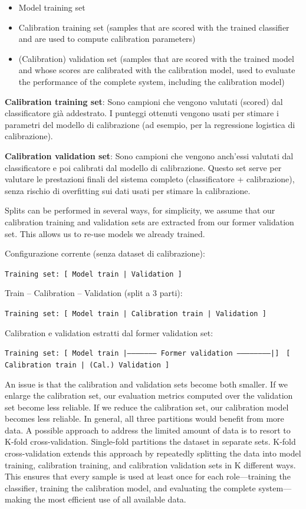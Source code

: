 \begin{itemize}
	\item Model training set
	\item Calibration training set (samples that are scored with the trained classifier and are used to compute calibration parameters)
	\item (Calibration) validation set (samples that are scored with the trained model and whose scores are calibrated with the calibration model, used to evaluate the performance of the complete system, including the calibration model)
\end{itemize}

\textbf{Calibration training set}: Sono campioni che vengono valutati (scored) dal classificatore già addestrato. I punteggi ottenuti vengono usati per stimare i parametri del modello di calibrazione (ad esempio, per la regressione logistica di calibrazione). 

\textbf{Calibration validation set}: Sono campioni che vengono anch'essi valutati dal classificatore e poi calibrati dal modello di calibrazione. Questo set serve per valutare le prestazioni finali del sistema completo (classificatore + calibrazione), senza rischio di overfitting sui dati usati per stimare la calibrazione.

Splits can be performed in several ways, for simplicity, we assume that our calibration training and validation sets are extracted from our former validation set. This allows us to re-use models we already trained.

Configurazione corrente (senza dataset di calibrazione):

\texttt{Training set:  [ Model train | Validation ]}

Train -- Calibration -- Validation (split a 3 parti):

\texttt{Training set:  [ Model train | Calibration train | Validation ]}

Calibration e validation estratti dal former validation set:

\texttt{Training set:  [ Model train |——————— Former validation ————————|]}
\texttt{                              [ Calibration train | (Cal.) Validation ]}

An issue is that the calibration and validation sets become both smaller. If we enlarge the calibration set, our evaluation metrics computed over the validation set become less reliable. If we reduce the calibration set, our calibration model becomes less reliable. In general, all three partitions would benefit from more data. A possible approach to address the limited amount of data is to resort to K-fold cross-validation. Single-fold partitions the dataset in separate sets. K-fold cross-validation extends this approach by repeatedly splitting the data into model training, calibration training, and calibration validation sets in K different ways. This ensures that every sample is used at least once for each role---training the classifier, training the calibration model, and evaluating the complete system---making the most efficient use of all available data.

